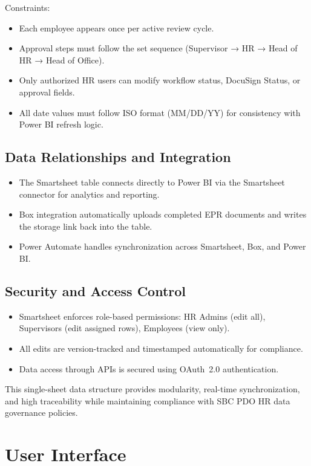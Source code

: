 \documentclass[12pt]{article}
\def\textbf#1{#1}%
\begin{document}
\textbf{Constraints:}
\begin{itemize}[nosep]
  \item Each employee appears once per active review cycle.  
  \item Approval steps must follow the set sequence (Supervisor → HR → Head of HR → Head of Office).  
  \item Only authorized HR users can modify workflow status, DocuSign Status, or approval fields.  
  \item All date values must follow ISO format (MM/DD/YY) for consistency with Power BI refresh logic.
\end{itemize}

\subsection{Data Relationships and Integration}
\begin{itemize}[nosep]
  \item The Smartsheet table connects directly to Power BI via the Smartsheet connector for analytics and reporting.  
  \item Box integration automatically uploads completed EPR documents and writes the storage link back into the table.  
  \item Power Automate handles synchronization across Smartsheet, Box, and Power BI.
\end{itemize}

\subsection{Security and Access Control}
\begin{itemize}[nosep]
  \item Smartsheet enforces role-based permissions: HR Admins (edit all), Supervisors (edit assigned rows), Employees (view only).  
  \item All edits are version-tracked and timestamped automatically for compliance.  
  \item Data access through APIs is secured using OAuth~2.0 authentication.
\end{itemize}

\noindent
This single-sheet data structure provides modularity, real-time synchronization, and high traceability while maintaining compliance with SBC PDO HR data governance policies.


\section{User Interface}
\end{document}
